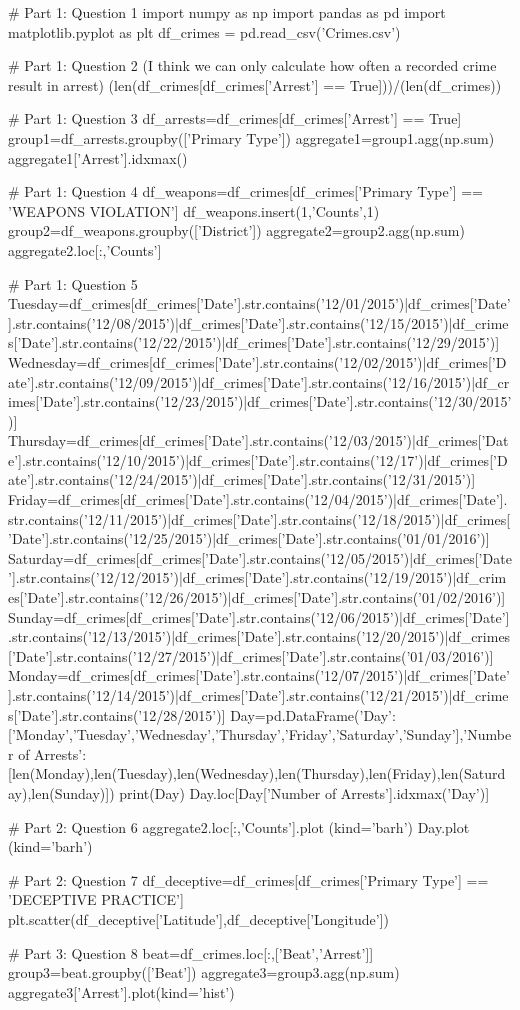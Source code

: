 # Part 1: Question 1
import numpy as np
import pandas as pd
import matplotlib.pyplot as plt
df_crimes = pd.read_csv('Crimes.csv')

# Part 1: Question 2 (I think we can only calculate how often a recorded crime result in arrest)
(len(df_crimes[df_crimes['Arrest'] == True]))/(len(df_crimes))

# Part 1: Question 3
df_arrests=df_crimes[df_crimes['Arrest'] == True]
group1=df_arrests.groupby(['Primary Type'])
aggregate1=group1.agg(np.sum)
aggregate1['Arrest'].idxmax()

# Part 1: Question 4
df_weapons=df_crimes[df_crimes['Primary Type'] == 'WEAPONS VIOLATION']
df_weapons.insert(1,'Counts',1)
group2=df_weapons.groupby(['District'])
aggregate2=group2.agg(np.sum)
aggregate2.loc[:,'Counts']

# Part 1: Question 5
Tuesday=df_crimes[df_crimes['Date'].str.contains('12/01/2015')|df_crimes['Date'].str.contains('12/08/2015')|df_crimes['Date'].str.contains('12/15/2015')|df_crimes['Date'].str.contains('12/22/2015')|df_crimes['Date'].str.contains('12/29/2015')]
Wednesday=df_crimes[df_crimes['Date'].str.contains('12/02/2015')|df_crimes['Date'].str.contains('12/09/2015')|df_crimes['Date'].str.contains('12/16/2015')|df_crimes['Date'].str.contains('12/23/2015')|df_crimes['Date'].str.contains('12/30/2015')]
Thursday=df_crimes[df_crimes['Date'].str.contains('12/03/2015')|df_crimes['Date'].str.contains('12/10/2015')|df_crimes['Date'].str.contains('12/17')|df_crimes['Date'].str.contains('12/24/2015')|df_crimes['Date'].str.contains('12/31/2015')]
Friday=df_crimes[df_crimes['Date'].str.contains('12/04/2015')|df_crimes['Date'].str.contains('12/11/2015')|df_crimes['Date'].str.contains('12/18/2015')|df_crimes['Date'].str.contains('12/25/2015')|df_crimes['Date'].str.contains('01/01/2016')]
Saturday=df_crimes[df_crimes['Date'].str.contains('12/05/2015')|df_crimes['Date'].str.contains('12/12/2015')|df_crimes['Date'].str.contains('12/19/2015')|df_crimes['Date'].str.contains('12/26/2015')|df_crimes['Date'].str.contains('01/02/2016')]
Sunday=df_crimes[df_crimes['Date'].str.contains('12/06/2015')|df_crimes['Date'].str.contains('12/13/2015')|df_crimes['Date'].str.contains('12/20/2015')|df_crimes['Date'].str.contains('12/27/2015')|df_crimes['Date'].str.contains('01/03/2016')]
Monday=df_crimes[df_crimes['Date'].str.contains('12/07/2015')|df_crimes['Date'].str.contains('12/14/2015')|df_crimes['Date'].str.contains('12/21/2015')|df_crimes['Date'].str.contains('12/28/2015')]
Day=pd.DataFrame({'Day':['Monday','Tuesday','Wednesday','Thursday','Friday','Saturday','Sunday'],'Number of Arrests':[len(Monday),len(Tuesday),len(Wednesday),len(Thursday),len(Friday),len(Saturday),len(Sunday)]})
print(Day)
Day.loc[Day['Number of Arrests'].idxmax('Day')]

# Part 2: Question 6
aggregate2.loc[:,'Counts'].plot (kind='barh')
Day.plot (kind='barh')

# Part 2: Question 7
df_deceptive=df_crimes[df_crimes['Primary Type'] == 'DECEPTIVE PRACTICE']
plt.scatter(df_deceptive['Latitude'],df_deceptive['Longitude'])

# Part 3: Question 8
beat=df_crimes.loc[:,['Beat','Arrest']]
group3=beat.groupby(['Beat'])
aggregate3=group3.agg(np.sum)
aggregate3['Arrest'].plot(kind='hist')